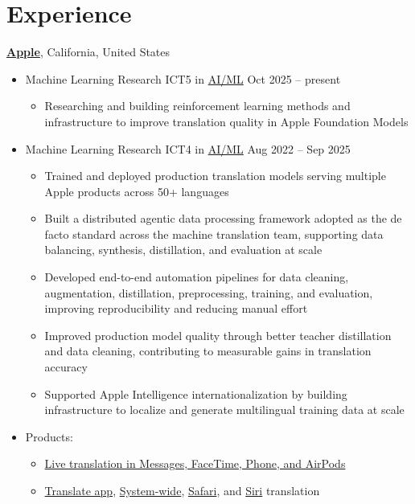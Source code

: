 
\section{\sc Experience}

{\bf \href{https://www.apple.com}{Apple}}, California, United States
\begin{itemize}
    \item[] Machine Learning Research ICT5 in \href{https://machinelearning.apple.com}{AI/ML} \hfill Oct 2025 -- present
    \begin{itemize}
        \item Researching and building reinforcement learning methods and infrastructure to improve translation quality in Apple Foundation Models
    \end{itemize}
    \item[] Machine Learning Research ICT4 in \href{https://machinelearning.apple.com}{AI/ML} \hfill Aug 2022 -- Sep 2025
    \begin{itemize}
        \item Trained and deployed production translation models serving multiple Apple products across 50+ languages
        \item Built a distributed agentic data processing framework adopted as the de facto standard across the machine translation team, supporting data balancing, synthesis, distillation, and evaluation at scale
        \item Developed end-to-end automation pipelines for data cleaning, augmentation, distillation, preprocessing, training, and evaluation, improving reproducibility and reducing manual effort
        \item Improved production model quality through better teacher distillation and data cleaning, contributing to measurable gains in translation accuracy
        \item Supported Apple Intelligence internationalization by building infrastructure to localize and generate multilingual training data at scale
    \end{itemize}
    \item[] Products:
        \begin{itemize}
            \item \href{https://www.apple.com/newsroom/2025/09/new-apple-intelligence-features-are-available-today/}{Live translation in Messages, FaceTime, Phone, and AirPods}
            \item \href{https://support.apple.com/guide/iphone/translate-text-voice-and-conversations-iphd74cb450f/ios}{Translate app},
                \href{https://support.apple.com/en-in/guide/iphone/iphab4dcff1d/ios}{System-wide},
                \href{https://support.apple.com/guide/iphone/browse-the-web-iph1fbef4daa/ios}{Safari},
                and \href{https://support.apple.com/en-in/guide/iphone/iph83aad8922/ios}{Siri} translation
        \end{itemize}
\end{itemize}

